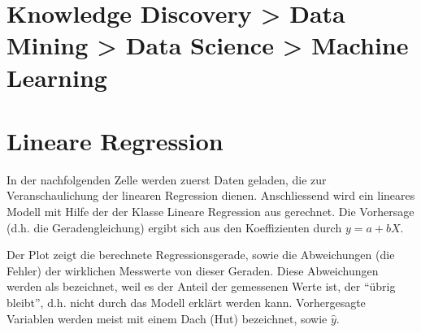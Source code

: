 \documentclass[letterpaper,10pt,english]{jupyterBook}
\begin{document}
\chapter{Knowledge Discovery \sphinxhyphen{}> Data Mining \sphinxhyphen{}> Data Science \sphinxhyphen{}> Machine Learning}
\label{\detokenize{Regression_Techniques:knowledge-discovery-data-mining-data-science-machine-learning}}\label{\detokenize{Regression_Techniques::doc}}
\noindent{}


\chapter{Lineare Regression}
\label{\detokenize{Regression_Techniques:lineare-regression}}
\sphinxAtStartPar
In der nachfolgenden Zelle werden zuerst Daten geladen, die zur Veranschaulichung der linearen Regression dienen.
Anschliessend wird ein lineares Modell mit Hilfe der der Klasse Lineare Regression aus  gerechnet. Die Vorhersage (d.h. die Geradengleichung) ergibt sich aus den Koeffizienten durch \(y = a + bX\).

\noindent{}

\sphinxAtStartPar
Der Plot zeigt die berechnete Regressionsgerade, sowie die Abweichungen (die Fehler) der wirklichen Messwerte von dieser Geraden. Diese Abweichungen werden als  bezeichnet, weil es der Anteil der gemessenen Werte ist, der “übrig bleibt”, d.h. nicht durch das Modell erklärt werden kann. Vorhergesagte Variablen werden meist mit einem Dach (Hut) bezeichnet, sowie \(\hat{y}\).
\end{document}

